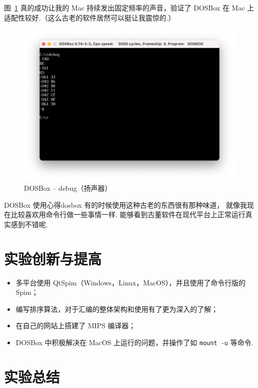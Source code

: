\documentclass[11pt]{SEU-Digital-Report}
\begin{document}
      图~\ref{fig:dos_speaker} 真的成功让我的 Mac 持续发出固定频率的声音，验证了 DOSBox 在 Mac 上适配性较好.（这么古老的软件居然可以挺让我震惊的.）
      \begin{figure}[h!]
        \centering
        \includegraphics[width=.8\linewidth]{fig/dosbox/speaker.png}
        \vspace{-5mm}
        \caption{DOSBox -- debug（扬声器）}
        \label{fig:dos_speaker}
      \end{figure}

      \begin{analyze}{DOSBox 使用心得}{dosbox}
        有的时候使用这种古老的东西很有那种味道，
        就像我现在比较喜欢用命令行做一些事情一样.
        能够看到古董软件在现代平台上正常运行真实感到不错呢.
      \end{analyze}

  \section{实验创新与提高}

    \begin{itemize}
      \item 多平台使用 QtSpim（Windows，Linux，MacOS），并且使用了命令行版的 Spim；
      \item 编写排序算法，对于汇编的整体架构和使用有了更为深入的了解；
      \item 在自己的网站上搭建了 MIPS 编译器；
      \item DOSBox 中积极解决在 MacOS 上运行的问题，并操作了如 \texttt{mount -u} 等命令.
    \end{itemize}

    

  \section{实验总结}
\end{document}
